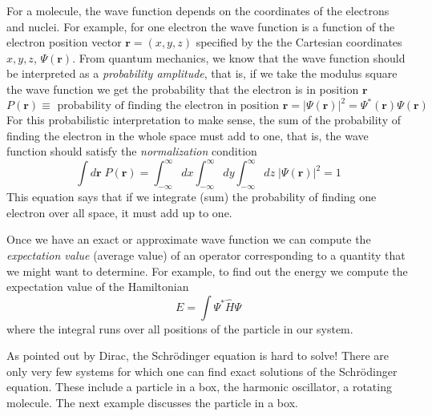 \documentclass[../Main/notes.tex]{subfiles}
\begin{document}
For a molecule, the wave function depends on the coordinates of the electrons and nuclei.
For example, for one electron the wave function is a function of the electron position vector $\mathbf{r} = (x,y,z)$ specified by the the Cartesian coordinates $x,y,z$, $\Psi(\mathbf{r})$.
From quantum mechanics, we know that the wave function should be interpreted as a \emph{probability amplitude}, that is, if we take the modulus square the wave function we get the probability that the electron is in position $\mathbf{r}$
\begin{equation}
P(\mathbf{r}) \equiv \text{ probability of finding the electron in position } \mathbf{r} = |\Psi(\mathbf{r})|^2  = \Psi^*(\mathbf{r}) \Psi(\mathbf{r}) 
\end{equation}
For this probabilistic interpretation to make sense, the sum of the probability of finding the electron in the whole space must add to one, that is, the wave function should satisfy the \emph{normalization} condition
\begin{equation}
\int  d\mathbf{r} \; P(\mathbf{r}) =  \int _{-\infty}^{\infty} dx \int _{-\infty}^{\infty} dy \int _{-\infty}^{\infty} dz \; |\Psi(\mathbf{r})|^2   = 1
\end{equation}
This equation says that if we integrate (sum) the probability of finding one electron over all space, it must add up to one.

Once we have an exact or approximate wave function we can compute the \emph{expectation value} (average value) of an operator corresponding to a quantity that we might want to determine.
For example, to find out the energy we compute the expectation value of the Hamiltonian
\begin{equation}
E = \int \Psi^* \hat{H} \Psi
\end{equation}
where the integral runs over all positions of the particle in our system.

As pointed out by Dirac, the Schr\"{o}dinger equation is hard to solve!
There are only very few systems for which one can find exact solutions of the Schr\"{o}dinger equation.
These include a particle in a box, the harmonic oscillator, a rotating molecule.
The next example discusses the particle in a box.
\end{document}
